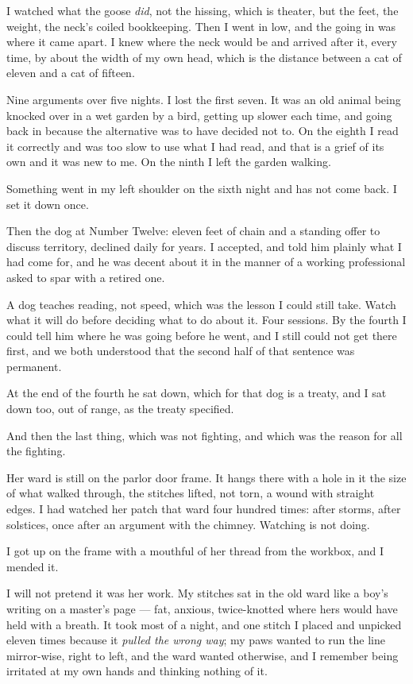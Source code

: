 I watched what the goose \emph{did}, not the hissing, which is theater, but the feet, the weight, the neck's coiled bookkeeping. Then I went in low, and the going in was where it came apart. I knew where the neck would be and arrived after it, every time, by about the width of my own head, which is the distance between a cat of eleven and a cat of fifteen.

Nine arguments over five nights. I lost the first seven. It was an old animal being knocked over in a wet garden by a bird, getting up slower each time, and going back in because the alternative was to have decided not to. On the eighth I read it correctly and was too slow to use what I had read, and that is a grief of its own and it was new to me. On the ninth I left the garden walking.

Something went in my left shoulder on the sixth night and has not come back. I set it down once.

Then the dog at Number Twelve: eleven feet of chain and a standing offer to discuss territory, declined daily for years. I accepted, and told him plainly what I had come for, and he was decent about it in the manner of a working professional asked to spar with a retired one.

A dog teaches reading, not speed, which was the lesson I could still take. Watch what it will do before deciding what to do about it. Four sessions. By the fourth I could tell him where he was going before he went, and I still could not get there first, and we both understood that the second half of that sentence was permanent.

At the end of the fourth he sat down, which for that dog is a treaty, and I sat down too, out of range, as the treaty specified.

And then the last thing, which was not fighting, and which was the reason for all the fighting.

Her ward is still on the parlor door frame. It hangs there with a hole in it the size of what walked through, the stitches lifted, not torn, a wound with straight edges. I had watched her patch that ward four hundred times: after storms, after solstices, once after an argument with the chimney. Watching is not doing.

I got up on the frame with a mouthful of her thread from the workbox, and I mended it.

I will not pretend it was her work. My stitches sat in the old ward like a boy's writing on a master's page --- fat, anxious, twice-knotted where hers would have held with a breath. It took most of a night, and one stitch I placed and unpicked eleven times because it \emph{pulled the wrong way}; my paws wanted to run the line mirror-wise, right to left, and the ward wanted otherwise, and I remember being irritated at my own hands and thinking nothing of it.

